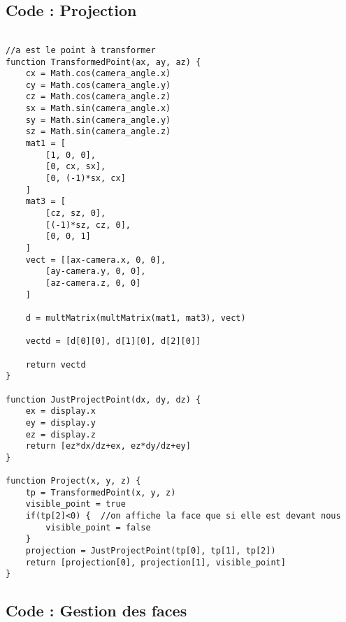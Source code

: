 \subsection{Code : Projection}
\begin{verbatim}

//a est le point à transformer
function TransformedPoint(ax, ay, az) {
	cx = Math.cos(camera_angle.x)
	cy = Math.cos(camera_angle.y)
	cz = Math.cos(camera_angle.z)
	sx = Math.sin(camera_angle.x)
	sy = Math.sin(camera_angle.y)
	sz = Math.sin(camera_angle.z)
	mat1 = [
		[1, 0, 0],
		[0, cx, sx],
		[0, (-1)*sx, cx]
	]
	mat3 = [
		[cz, sz, 0],
		[(-1)*sz, cz, 0],
		[0, 0, 1]
	]
	vect = [[ax-camera.x, 0, 0],
		[ay-camera.y, 0, 0],
		[az-camera.z, 0, 0]
	]

	d = multMatrix(multMatrix(mat1, mat3), vect)
	
	vectd = [d[0][0], d[1][0], d[2][0]] 

	return vectd
}

function JustProjectPoint(dx, dy, dz) {
	ex = display.x
	ey = display.y
	ez = display.z
	return [ez*dx/dz+ex, ez*dy/dz+ey]
}

function Project(x, y, z) {
	tp = TransformedPoint(x, y, z)
	visible_point = true
	if(tp[2]<0) {  //on affiche la face que si elle est devant nous
		visible_point = false
	}
	projection = JustProjectPoint(tp[0], tp[1], tp[2])
	return [projection[0], projection[1], visible_point]
}
\end{verbatim}

\clearpage

\subsection{Code : Gestion des faces}

